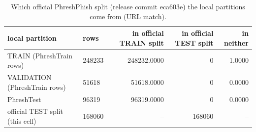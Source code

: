 \begin{table}[t]
\centering
\scriptsize
\caption{Which official PhreshPhish split (release commit eca603e) the local partitions come from (URL match).}
\label{tab:rev_R22_phreshphish_split_provenance}
\begin{tabular}{llrrr}
\toprule
local partition & rows & in official TRAIN split & in official TEST split & in neither \\
\midrule
TRAIN (PhreshTrain rows) & 248233 & 248232.0000 & 0 & 1.0000 \\
VALIDATION (PhreshTrain rows) & 51618 & 51618.0000 & 0 & 0.0000 \\
PhreshTest & 96319 & 96319.0000 & 0 & 0.0000 \\
official TEST split (this cell) & 168060 & -- & 168060 & -- \\
\bottomrule
\end{tabular}
\end{table}